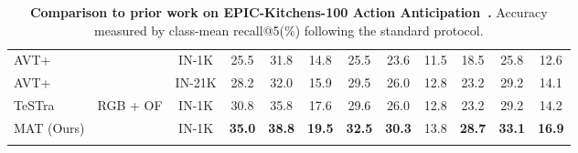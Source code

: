 \begin{table}[t]
{\begin{tabular}{lcccc>{\columncolor{light}}ccccccc}
         AVT+~\cite{avt} &  & IN-1K & 25.5 & 31.8 & 14.8 & 25.5 & 23.6 & 11.5 & 18.5 & 25.8 & 12.6 \\
         AVT+~\cite{avt} &  & IN-21K & 28.2 & 32.0 & 15.9 & 29.5 & 26.0 & 12.8 & 23.2 & 29.2 & 14.1 \\
        \hline
         TeSTra~\cite{testra} & \multirow{2}{*}{RGB + OF} & IN-1K & 30.8 & 35.8 & 17.6 & 29.6 & 26.0 & 12.8 & 23.2 & 29.2 & 14.2 \\
        MAT (Ours) & & IN-1K & \textbf{35.0} & \textbf{38.8} & \textbf{19.5} & \textbf{32.5} & \textbf{30.3} & 13.8 & \textbf{28.7} & \textbf{33.1} & \textbf{16.9}  \\
    \arrayrulecolor{black}
    \end{tabular}
    }
    \caption{\textbf{Comparison to prior work on EPIC-Kitchens-100 Action Anticipation~\cite{ek100}.} 
Accuracy measured by class-mean recall@5(\%) following the standard protocol.}
    \vspace{-3mm}
    \label{tab:ek100_anticipation}
\end{table}

\begin{table}[t]
    \centering
    \small
    \caption{\textbf{Exploring different visual encoders} for EK100 action anticipation. V or N denotes the encoder is pretrained on verb or noun subset~\cite{internvideo}. ``FT'' is that the encoder is fine-tuned on the classification task of EK100.}
    \label{tab:pretrain}
    \vspace{-5mm}
\end{table}

